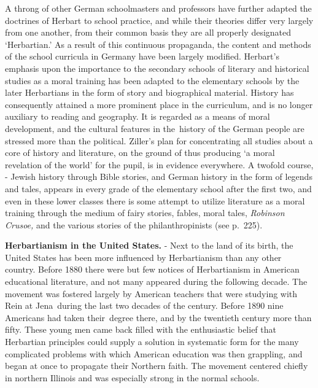 \documentclass[
]{book}
\begin{document}
A throng of other German schoolmasters and professors have further adapted the doctrines of Herbart to school practice, and while their theories differ very largely from one another, from their common basis they are all properly designated `Herbartian.' As a result of this continuous propaganda, the content and methods of the school curricula in Germany have been largely modified. Herbart's emphasis upon the importance to the secondary schools of literary and historical studies as a moral training has been adapted to the elementary schools by the later Herbartians in the form of story and biographical material. History has consequently attained a more prominent place in the curriculum, and is no longer auxiliary to reading and geography. It is regarded as a means of moral development, and the cultural features in the~history of the German people are stressed more than the political. Ziller's plan for concentrating all studies about a core of history and literature, on the ground of thus producing `a moral revelation of the world' for the pupil, is in evidence everywhere. A twofold course, - Jewish history through Bible stories, and German history in the form of legends and tales, appears in every grade of the elementary school after the first two, and even in these lower classes there is some attempt to utilize literature as a moral training through the medium of fairy stories, fables, moral tales, \emph{Robinson Crusoe,} and the various stories of the philanthropinists (see p.~225).

\textbf{Herbartianism in the United States.} - Next to the land of its birth, the United States has been more influenced by Herbartianism than any other country. Before 1880 there were but few notices of Herbartianism in American educational literature, and not many appeared during the following decade. The movement was fostered largely by American teachers that were studying with Rein at Jena~during the last two decades of the century. Before 1890 nine Americans had taken their~degree there, and by the twentieth century more than fifty. These young men came back filled with the enthusiastic belief that Herbartian principles could supply a solution in systematic form for the many complicated problems with which American education was then grappling, and began at once to propagate their Northern faith. The movement centered chiefly in northern Illinois and was especially strong in the normal schools.
\end{document}
